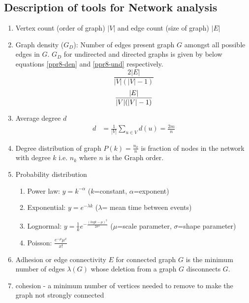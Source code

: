 \documentclass[preprint,12pt]{elsarticle}
\begin{document}
\subsection{Description of tools for Network analysis} \label{tools}
\begin{enumerate}

\item Vertex count (order of graph) $|V|$ and edge count (size of graph) $|E|$
\item Graph density ($G_D$): Number of edges present graph $G$ amongst all possible edges in $G$. $G_D$ for undirected and directed graphs is given by below equations \ref{ppr8-den} and \ref{ppr8-und} respectively.\\
\begin{equation}\label{ppr8-den}
     \frac{2|E|}{|V|(|V|-1)}
     \end{equation}
\begin{equation}\label{ppr8-und}
    \frac{|E|}{|V|(|V|-1)}\\
\end{equation}
\item Average degree $d$ 
\begin{align}
    d &= \frac 1 {|V|} \sum_{u\in V} d(u) = \frac {2m} n 
\end{align}
\item Degree distribution of graph $P(k) = \frac{n_k}{n}$ is fraction of nodes in the network with degree $k$ i.e. $n_k$ where $n$ is the Graph order.

\item Probability distribution
\begin{enumerate}
    \item Power law: $y = k^{- \alpha}$ ($k$=constant, $\alpha$=exponent)
    \item Exponential: $y = e^{- \lambda k}$ ($\lambda$= mean time between events)
    \item Lognormal: $y = \frac{1}{k} e^{-\frac{(log k - \mu)^2}{2\sigma^2}}$ ($\mu$=scale parameter, $\sigma$=shape parameter)
    \item Poisson: $\frac{e^{-\mu} \mu^{x}}{x!}$
\end{enumerate}

\item Adhesion or edge connectivity $E$ for connected graph $G$ is the minimum number of edges $\lambda(G)$ whose deletion from a graph $G$ disconnects $G$.\\

\item cohesion - a minimum number of vertices needed to remove to make the graph not strongly connected


\end{enumerate}
\end{document}
